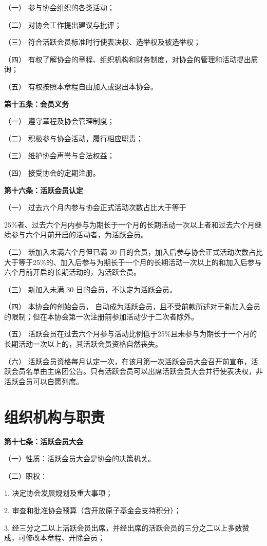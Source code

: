 \documentclass{mjsart}
\begin{document}
（一） 参与协会组织的各类活动；

（二） 对协会工作提出建议与批评；

（三） 符合活跃会员标准时行使表决权、选举权及被选举权；

（四） 有权了解协会的章程、组织机构和财务制度，对协会的管理和活动提出质询；

（五） 有权按照本章程自由加入或退出本协会。

\textbf{第十五条：会员义务}

（一） 遵守章程及协会管理制度；

（二） 积极参与协会活动，履行相应职责；

（三） 维护协会声誉与合法权益；

（四） 接受协会的定期注册。

\textbf{第十六条：活跃会员认定}

（一） 过去六个月内参与协会正式活动次数占比大于等于

25\%者、过去六个月内参与为期长于一个月的长期活动一次以上者和过去六个月继续参与六个月前开启的活动者，为活跃会员。

（二） 新加入未满六个月但已满 30 日的会员，加入后参与协会正式活动次数占比大于等于25\%的、加入后参与为期长于一个月的长期活动一次以上的和加入后参与六个月前开启的长期活动的，为活跃会员。

（三） 新加入未满 30 日的会员，不认定为活跃会员。

（四） 本协会的创始会员， 自动成为活跃会员，且不受前款所述对于新加入会员的限制；但在本协会第一次注册前参加活动少于二次者除外。

（五） 活跃会员在过去六个月参与活动比例低于25\%且未参与为期长于一个月的长期活动一次以上的，其活跃会员资格自然丧失。

（六） 活跃会员资格每月认定一次，在该月第一次活跃会员大会召开前宣布，活跃会员名单由主席团公告。只有活跃会员可以出席活跃会员大会并行使表决权，非活跃会员可以自愿列席。

\section{组织机构与职责}

\textbf{第十七条：活跃会员大会}

（一）性质：活跃会员大会是协会的决策机关。

（二）职权：

1. 决定协会发展规划及重大事项；

2. 审查和批准协会预算（含开放原子基金会支持积分）；

3. 经三分之二以上活跃会员出席，并经出席的活跃会员的三分之二以上多数赞成，可修改本章程、开除会员；
\end{document}
